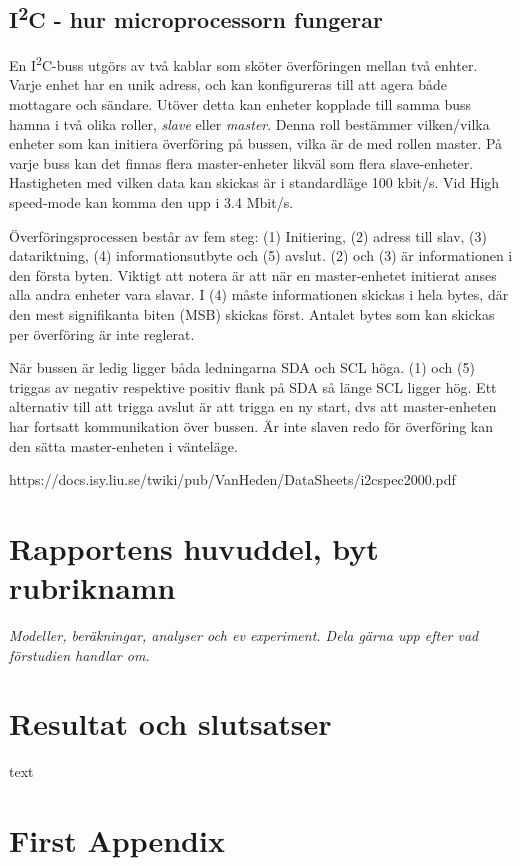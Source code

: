 \documentclass[11pt]{article}
\begin{document}
\begin{flushleft}
\subsection{I\textsuperscript{2}C - hur microprocessorn fungerar}
En I\textsuperscript{2}C-buss utgörs av två kablar som sköter överföringen mellan två enhter. Varje enhet har en unik adress, och kan konfigureras till att agera både mottagare och sändare. Utöver detta kan enheter kopplade till samma buss hamna i två olika roller, \textit{slave} eller \textit{master}. Denna roll bestämmer vilken/vilka enheter som kan initiera överföring på bussen, vilka är de med rollen master. På varje buss kan det finnas flera master-enheter likväl som flera slave-enheter. Hastigheten med vilken data kan skickas är i standardläge 100 kbit/s. Vid High speed-mode kan komma den upp i 3.4 Mbit/s.

Överföringsprocessen består av fem steg: (1) Initiering, (2) adress till slav, (3) datariktning, (4) informationsutbyte och (5) avslut. (2) och (3) är informationen i den första byten. Viktigt att notera är att när en master-enhetet initierat anses alla andra enheter vara slavar. I (4) måste informationen skickas i hela bytes, där den mest signifikanta biten (MSB) skickas först. Antalet bytes som kan skickas per överföring är inte reglerat.

När bussen är ledig ligger båda ledningarna SDA och SCL höga. (1) och (5) triggas av negativ respektive positiv flank på SDA så länge SCL ligger hög. Ett alternativ till att trigga avslut är att trigga en ny start, dvs att master-enheten har fortsatt kommunikation över bussen. Är inte slaven redo för överföring kan den sätta master-enheten i vänteläge.

https://docs.isy.liu.se/twiki/pub/VanHeden/DataSheets/i2cspec2000.pdf
\pagebreak

\section{Rapportens huvuddel, byt rubriknamn}
\textit{Modeller, beräkningar, analyser och ev experiment. Dela gärna upp efter vad förstudien handlar om.}

\pagebreak

\section{Resultat och slutsatser}
text

\pagebreak
{}



\pagebreak
\appendix
\section{First Appendix}

\end{flushleft}
\end{document}
